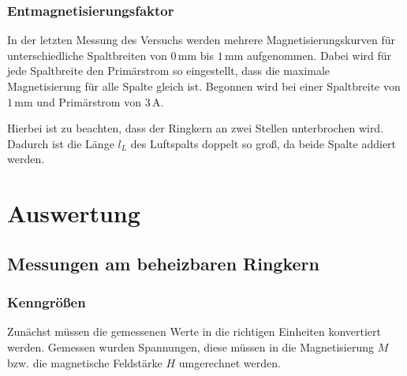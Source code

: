 \documentclass[12pt,a4paper]{scrartcl}
\numberwithin{equation}{section} %
\begin{document}
\hypertarget{entmagnetisierungsfaktor-1}{%
\subsubsection{Entmagnetisierungsfaktor}\label{entmagnetisierungsfaktor-1}}
In der letzten Messung des Versuchs werden mehrere Magnetisierungskurven für unterschiedliche Spaltbreiten von $0\,\mathrm{mm}$ bis $1\,\mathrm{mm}$ aufgenommen. Dabei wird für jede Spaltbreite den Primärstrom so eingestellt, dass die maximale Magnetisierung für alle Spalte gleich ist. Begonnen wird bei einer Spaltbreite von $1\,\mathrm{mm}$ und Primärstrom von $3\,\mathrm A$.

Hierbei ist zu beachten, dass der Ringkern an zwei Stellen unterbrochen wird. Dadurch ist die Länge $l_L$ des Luftspalts doppelt so groß, da beide Spalte addiert werden.

\clearpage
\hypertarget{auswertung}{%
\section{Auswertung}\label{auswertung}}

\hypertarget{messungen-am-beheizbaren-ringkern}{%
\subsection{Messungen am beheizbaren
Ringkern}\label{messungen-am-beheizbaren-ringkern}}

\hypertarget{kenngruxf6uxdfen}{%
\subsubsection{Kenngrößen}\label{kenngruxf6uxdfen}}
Zunächst müssen die gemessenen Werte in die richtigen Einheiten konvertiert werden. Gemessen wurden Spannungen, diese müssen in die Magnetisierung $M$ bzw. die magnetische Feldstärke $H$ umgerechnet werden.
\end{document}
